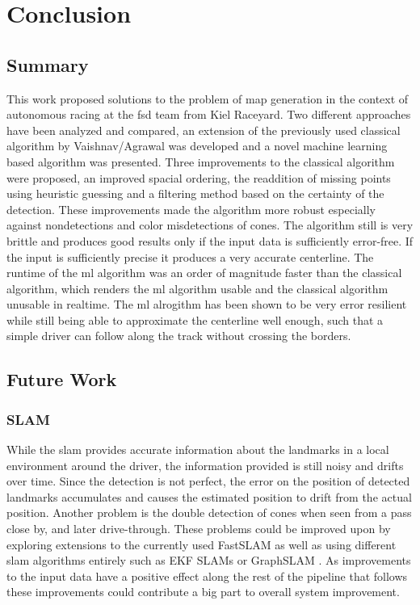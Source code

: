 \chapter{Conclusion}
\label{chap:end}

\section{Summary}
This work proposed solutions to the problem of map generation in the context of autonomous racing at the \ac{fsd} team from Kiel Raceyard. Two different approaches have been analyzed and compared, an extension of the previously used classical algorithm by Vaishnav/Agrawal was developed and a novel machine learning based algorithm was presented. Three improvements to the classical algorithm were proposed, an improved spacial ordering, the readdition of missing points using heuristic guessing and a filtering method based on the certainty of the detection. These improvements made the algorithm more robust especially against nondetections and color misdetections of cones. The algorithm still is very brittle and produces good results only if the input data is sufficiently error-free. If the input is sufficiently precise it produces a very accurate centerline. The runtime of the \ac{ml} algorithm was an order of magnitude faster than the classical algorithm, which renders the \ac{ml} algorithm usable and the classical algorithm unusable in realtime. The \ac{ml} alrogithm has been shown to be very error resilient while still being able to approximate the centerline well enough, such that a simple driver can follow along the track without crossing the borders.

\section{Future Work}
\subsection{SLAM} 
While the \ac{slam} provides accurate information about the landmarks in a local environment around the driver, the information provided is still noisy and drifts over time. Since the detection is not perfect, the error on the position of detected landmarks accumulates and causes the estimated position to drift from the actual position. Another problem is the double detection of cones when seen from a pass close by, and later drive-through. These problems could be improved upon by exploring extensions to the currently used FastSLAM \cite{FastSLAM2002} as well as using different \ac{slam} algorithms entirely such as EKF SLAMs \cite{EKFSLAM1986} or GraphSLAM \cite{graphSLAM2006}. As improvements to the input data have a positive effect along the rest of the pipeline that follows these improvements could contribute a big part to overall system improvement.
